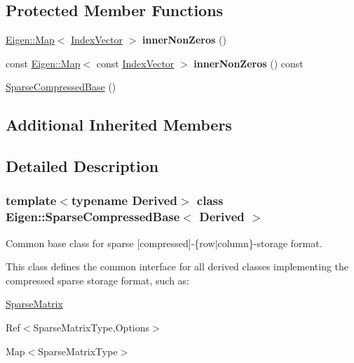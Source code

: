 \subsection*{Protected Member Functions}
\begin{DoxyCompactItemize}
\item 
\mbox{\label{class_eigen_1_1_sparse_compressed_base_afcc0c2006138eb8705a2f7f020b4ff1b}} 
\mbox{\hyperlink{class_eigen_1_1_map}{Eigen\+::\+Map}}$<$ \mbox{\hyperlink{class_eigen_1_1_matrix}{Index\+Vector}} $>$ {\bfseries inner\+Non\+Zeros} ()
\item 
\mbox{\label{class_eigen_1_1_sparse_compressed_base_a75ea52c348fcbf2eb7728d86a604c34a}} 
const \mbox{\hyperlink{class_eigen_1_1_map}{Eigen\+::\+Map}}$<$ const \mbox{\hyperlink{class_eigen_1_1_matrix}{Index\+Vector}} $>$ {\bfseries inner\+Non\+Zeros} () const
\item 
\mbox{\hyperlink{class_eigen_1_1_sparse_compressed_base_af79f020db965367d97eb954fc68d8f99}{Sparse\+Compressed\+Base}} ()
\end{DoxyCompactItemize}
\subsection*{Additional Inherited Members}


\subsection{Detailed Description}
\subsubsection*{template$<$typename Derived$>$\newline
class Eigen\+::\+Sparse\+Compressed\+Base$<$ Derived $>$}

Common base class for sparse \mbox{[}compressed\mbox{]}-\/\{row$\vert$column\}-\/storage format. 

This class defines the common interface for all derived classes implementing the compressed sparse storage format, such as\+:
\begin{DoxyItemize}
\item \mbox{\hyperlink{class_eigen_1_1_sparse_matrix}{Sparse\+Matrix}}
\item Ref$<$\+Sparse\+Matrix\+Type,\+Options$>$
\item Map$<$\+Sparse\+Matrix\+Type$>$ 
\end{DoxyItemize}

